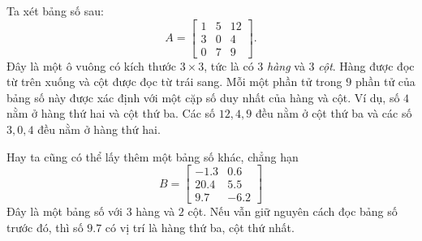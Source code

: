 
Ta xét bảng số sau:
\[ A=
\begin{bmatrix}
    1&5&12\\
    3&0&4\\
    0&7&9
\end{bmatrix}.
\]
Đây là một ô vuông có kích thước \(3\times 3\), tức là có \(3\) \emph{hàng} và \(3\) \emph{cột}. Hàng được đọc từ trên xuống và cột được đọc từ trái sang. Mỗi một phần tử  trong \(9\) phần tử  của bảng số này được xác định với một cặp số duy nhất của hàng và cột. Ví dụ, số \(4\) nằm ở hàng thứ hai và cột thứ ba. 
Các số \(12,4,9\) đều nằm ở cột thứ ba và các số \(3,0,4\) đều nằm ở hàng thứ hai. 

Hay ta cũng có thể lấy thêm một bảng số khác, chẳng hạn
\[B=\begin{bmatrix}
    -1.3&0.6\\
    20.4&5.5\\
    9.7&-6.2
\end{bmatrix}\] Đây là một bảng số với \(3\) hàng và \(2\) cột. Nếu vẫn giữ nguyên cách đọc bảng số trước đó, thì số \(9.7\) có vị trí là hàng thứ ba, cột thứ nhất. 

